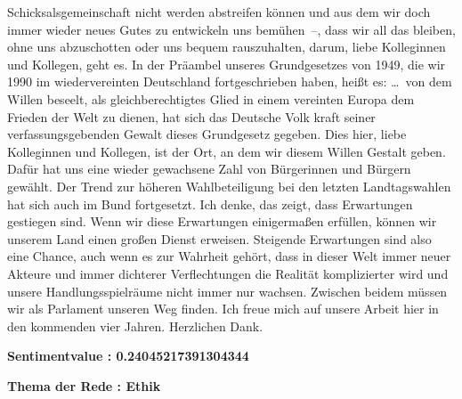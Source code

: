 \documentclass[a4paper,11pt]{article}
\begin{document}
Schicksalsgemeinschaft nicht werden abstreifen können und aus dem wir doch immer wieder neues Gutes zu entwickeln uns bemühen –, dass wir all das bleiben, ohne uns abzuschotten oder uns bequem rauszuhalten, darum, liebe Kolleginnen und Kollegen, geht es. In der Präambel unseres Grundgesetzes von 1949, die wir 1990 im wiedervereinten Deutschland fortgeschrieben haben, heißt es: … von dem Willen beseelt, als gleichberechtigtes Glied in einem vereinten Europa dem Frieden der Welt zu dienen, hat sich das Deutsche Volk kraft seiner verfassungsgebenden Gewalt dieses Grundgesetz gegeben. Dies hier, liebe Kolleginnen und Kollegen, ist der Ort, an dem wir diesem Willen Gestalt geben. Dafür hat uns eine wieder gewachsene Zahl von Bürgerinnen und Bürgern gewählt. Der Trend zur höheren Wahlbeteiligung bei den letzten Landtagswahlen hat sich auch im Bund fortgesetzt. Ich denke, das zeigt, dass Erwartungen gestiegen sind. Wenn wir diese Erwartungen einigermaßen erfüllen, können wir unserem Land einen großen Dienst erweisen. Steigende Erwartungen sind also eine Chance, auch wenn es zur Wahrheit gehört, dass in dieser Welt immer neuer Akteure und immer dichterer Verflechtungen die Realität komplizierter wird und unsere Handlungsspielräume nicht immer nur wachsen. Zwischen beidem müssen wir als Parlament unseren Weg finden. Ich freue mich auf unsere Arbeit hier in den kommenden vier Jahren. Herzlichen Dank.

\textbf{Sentimentvalue : 0.24045217391304344}

\textbf{Thema der Rede : Ethik}
\vspace*{1cm}
\end{document}
